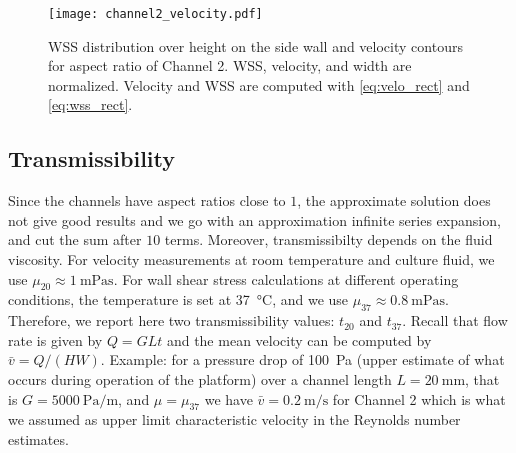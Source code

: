 \documentclass{article}
\begin{document}
\begin{figure}
    \centering
    \texttt{[image: channel2\_velocity.pdf]}
    \caption{WSS distribution over height on the side wall and velocity contours for aspect ratio of Channel 2. WSS, velocity, and width are normalized. Velocity and WSS are computed with \cref{eq:velo_rect} and \cref{eq:wss_rect}.}
    \label{fig:channel2}
\end{figure}

\subsection{Transmissibility}
Since the channels have aspect ratios close to $1$, the approximate solution does not give good results and we go with an approximation infinite series expansion, and cut the sum after $10$ terms. Moreover, transmissibilty depends on the fluid viscosity. For velocity measurements at room temperature and culture fluid, we use $\mu_{20} \approx \SI{1}{\milli\pascal\s}$. For wall shear stress calculations at different operating conditions, the temperature is set at \SI{37}{\celsius}, and we use $\mu_{37} \approx \SI{0.8}{\milli\pascal\s}$. Therefore, we report here two transmissibility values: $t_{20}$ and $t_{37}$. Recall that flow rate is given by $Q = GLt$ and the mean velocity can be computed by $\bar{v} = Q/(HW)$. Example: for a pressure drop of \SI{100}{\pascal} (upper estimate of what occurs during operation of the platform) over a channel length $L = \SI{20}{\milli\m}$, that is $G = \SI{5000}{\pascal\per\m}$, and $\mu = \mu_{37}$ we have $\bar{v} = \SI{0.2}{\m\per\s}$ for Channel 2 which is what we assumed as upper limit characteristic velocity in the Reynolds number estimates.
\end{document}
